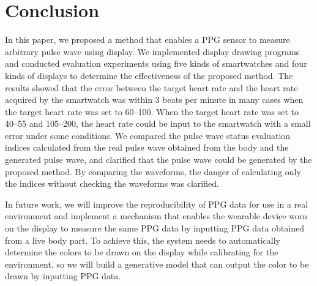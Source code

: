 \documentclass[sigchi,authordraft]{acmart}
\begin{document}
\section{Conclusion}
\label{sec:conclusion}
In this paper, we proposed a method that enables a PPG sensor to measure arbitrary pulse wave using display. We implemented display drawing programs and conducted evaluation experiments using five kinds of smartwatches and four kinds of displays to determine the effectiveness of the proposed method. The results showed that the error between the target heart rate and the heart rate acquired by the smartwatch was within $3$ beats per minute in many cases when the target heart rate was set to 60--100. When the target heart rate was set to 40--55 and 105--200, the heart rate could be input to the smartwatch with a small error under some conditions. We compared the pulse wave status evaluation indices calculated from the real pulse wave obtained from the body and the generated pulse wave, and clarified that the pulse wave could be generated by the proposed method. By comparing the waveforms, the danger of calculating only the indices without checking the waveforms was clarified.\par

In future work, we will improve the reproducibility of PPG data for use in a real environment and implement a mechanism that enables the wearable device worn on the display to measure the same PPG data by inputting PPG data obtained from a live body part. To achieve this, the system needs to automatically determine the colors to be drawn on the display while calibrating for the environment, so we will build a generative model that can output the color to be drawn by inputting PPG data.





\end{document}
